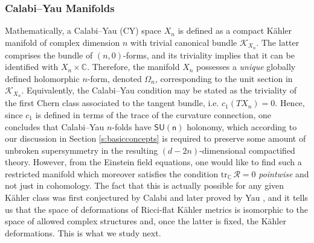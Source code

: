 \subsubsection*{Calabi--Yau Manifolds}

Mathematically, a Calabi--Yau (CY) space $X_n$ is defined as a compact K\"ahler manifold of complex dimension $n$ with trivial canonical bundle $\mathscr{K}_{X_n}$. The latter comprises the bundle of $(n,0)$-forms, and its triviality implies that it can be identified with $X_n \times \mathbb{C}$. Therefore, the manifold $X_n$ possesses a \emph{unique} globally defined holomorphic $n$-form, denoted $\Omega_n$, corresponding to the unit section in $\mathscr{K}_{X_n}$. Equivalently, the Calabi--Yau condition may be stated as the triviality of the first Chern class associated to the tangent bundle, i.e. $c_1 (TX_n)=0$. Hence, since $c_1$ is defined in terms of the trace of the curvature connection, one concludes that Calabi--Yau $n$-folds have $\mathsf{SU(n)}$ holonomy, which according to our discussion in Section \ref{s:basicconcepts} is required to preserve some amount of unbroken supersymmetry in the resulting $(d-2n)$-dimensional compactified theory. However, from the Einstein field equations, one would like to find such a restricted manifold which moreover satisfies the condition $\text{tr}_{\mathbb{C}}\, \mathcal{R}=0$ \emph{pointwise} and not just in cohomology. The fact that this is actually possible for any given K\"ahler class was first conjectured by Calabi \cite{calabi} and later proved by Yau \cite{yau}, and it tells us that the space of deformations of Ricci-flat K\"ahler metrics is isomorphic to the space of allowed complex structures and, once the latter is fixed, the K\"ahler deformations. This is what we study next.

